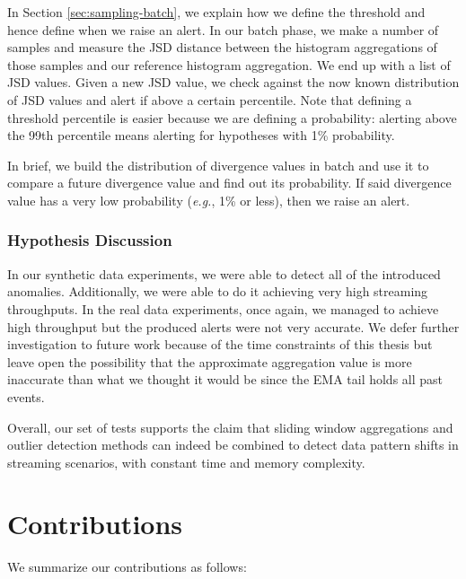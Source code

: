 In Section \ref{sec:sampling-batch}, we explain how we define the threshold and hence define when we raise an alert. In our batch phase, we make a number of samples and measure the JSD distance between the histogram aggregations of those samples and our reference histogram aggregation. We end up with a list of JSD values. Given a new JSD value, we check against the now known distribution of JSD values and alert if above a certain percentile. Note that defining a threshold percentile is easier because we are defining a probability: alerting above the 99th percentile means alerting for hypotheses with 1\% probability.

In brief, we build the distribution of divergence values in batch and use it to compare a future divergence value and find out its probability. If said divergence value has a very low probability (\textit{e.g.}, 1\% or less), then we raise an alert.

\subsubsection*{Hypothesis Discussion}
In our synthetic data experiments, we were able to detect all of the introduced anomalies. Additionally, we were able to do it achieving very high streaming throughputs. In the real data experiments, once again, we managed to achieve high throughput but the produced alerts were not very accurate. We defer further investigation to future work because of the time constraints of this thesis but leave open the possibility that the approximate aggregation value is more inaccurate than what we thought it would be since the EMA tail holds all past events.

Overall, our set of tests supports the claim that sliding window aggregations and outlier detection methods can indeed be combined to detect data pattern shifts in streaming scenarios, with constant time and memory complexity.

\section{Contributions}
We summarize our contributions as follows:

